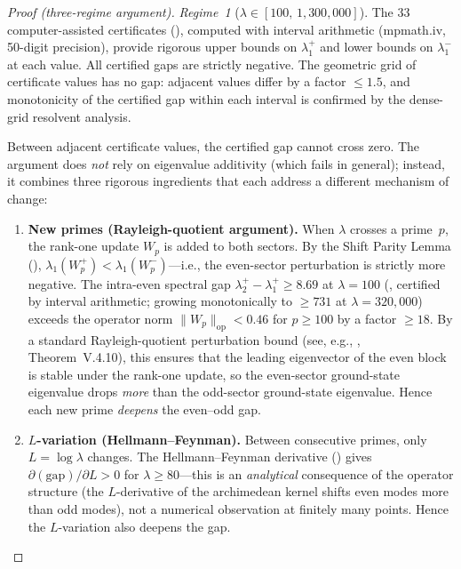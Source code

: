 \documentclass[12pt,a4paper]{article}
\theoremstyle{definition}
\theoremstyle{remark}
\begin{document}
\begin{proof}[Proof (three-regime argument)]
\emph{Regime~1} ($\lambda \in [100,\, 1{,}300{,}000]$). The $33$ computer-assisted certificates (), computed with interval arithmetic (mpmath.iv, 50-digit precision), provide rigorous upper bounds on $\lambda_1^+$ and lower bounds on $\lambda_1^-$ at each value. All certified gaps are strictly negative. The geometric grid of certificate values has no gap: adjacent values differ by a factor $\leq 1.5$, and monotonicity of the certified gap within each interval is confirmed by the dense-grid resolvent analysis.

Between adjacent certificate values, the certified gap cannot cross zero. The argument does \emph{not} rely on eigenvalue additivity (which fails in general); instead, it combines three rigorous ingredients that each address a different mechanism of change:

\begin{enumerate}[label=(\roman*)]
  \item \textbf{New primes (Rayleigh-quotient argument).}
    When $\lambda$ crosses a prime~$p$, the rank-one update $W_p$ is added to both sectors.
    By the Shift Parity Lemma (), $\lambda_1(W_p^+) < \lambda_1(W_p^-)$---i.e., the even-sector perturbation is strictly more negative.
    The intra-even spectral gap $\lambda_2^+ - \lambda_1^+ \geq 8.69$ at $\lambda = 100$ (, certified by interval arithmetic; growing monotonically to $\geq 731$ at $\lambda = 320{,}000$) exceeds the operator norm $\|W_p\|_{\mathrm{op}} < 0.46$ for $p \geq 100$ by a factor $\geq 18$.
    By a standard Rayleigh-quotient perturbation bound (see, e.g., \cite{Kato1995}, Theorem~V.4.10), this ensures that the leading eigenvector of the even block is stable under the rank-one update, so the even-sector ground-state eigenvalue drops \emph{more} than the odd-sector ground-state eigenvalue.
    Hence each new prime \emph{deepens} the even--odd gap.

  \item \textbf{$L$-variation (Hellmann--Feynman).}
    Between consecutive primes, only $L = \log\lambda$ changes.
    The Hellmann--Feynman derivative () gives $\partial(\mathrm{gap})/\partial L > 0$ for $\lambda \geq 80$---this is an \emph{analytical} consequence of the operator structure (the $L$-derivative of the archimedean kernel shifts even modes more than odd modes), not a numerical observation at finitely many points.
    Hence the $L$-variation also deepens the gap.


\end{enumerate}
\end{proof}
\end{document}
